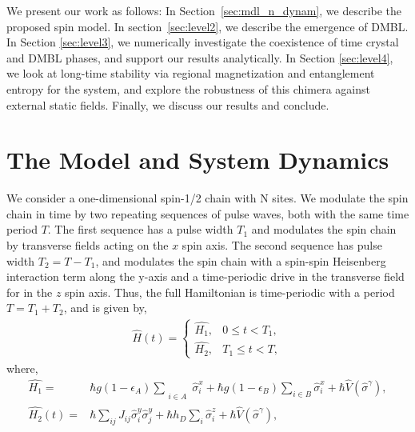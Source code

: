 \documentclass[12pt]{iopart}
\begin{document}
We present our work as follows: In Section~\ref{sec:mdl_n_dynam}, we describe the proposed spin model. In section~\ref{sec:level2}, we describe the emergence of DMBL. In Section \ref{sec:level3}, we numerically investigate the coexistence of time crystal and DMBL phases, and support our results analytically. In Section \ref{sec:level4}, we look at long-time stability via regional magnetization and entanglement entropy for the system, and explore the robustness of this chimera against external static fields. Finally, we discuss our results and conclude.	
	
\section{\label{sec:mdl_n_dynam} The Model and System Dynamics}
We consider a one-dimensional spin-1/2 chain with N sites.  We modulate the spin chain in time by two repeating sequences of pulse waves, both with the same time period $T$.  The first sequence has a pulse width $T_1$ and modulates the spin chain by transverse fields acting on the $x$ spin axis. The second sequence has pulse width $T_2=T-T_1$, and modulates the spin chain with a spin-spin Heisenberg interaction term along the y-axis and a time-periodic drive in the transverse field for in the $z$ spin axis. Thus, the full Hamiltonian is time-periodic with a period $T=T_1+T_2$, and is given by,
\begin{align}
    \hat{H}(t) = 
    \begin{cases}
        \hat{H_1} , & 0\leq t < T_1,\\
        \hat{H_2} , & T_1\leq t < T,
    \end{cases}
    \label{eq:cleanham}
\end{align}
where,
\begin{align}
    \hat{H_1} = & \hbar g (1-\epsilon_A) \sum_{\substack{\\i \in A}}\hat{\sigma}^x_i + \hbar g (1-\epsilon_B) \sum_{i \in B}\hat{\sigma}^x_i+ \hbar\hat{V}(\hat{\sigma}^{\gamma}),\label{eq:sysham1}\\
    \hat{H_2}(t) = & \hbar\sum_{ij} J_{ij} \hat{\sigma}^y_i \hat{\sigma}^y_{j} +  \hbar h_D \sum_i \hat{\sigma}^z_i + \hbar\hat{V}(\hat{\sigma}^{\gamma}),
    \label{eq:sysham2}
\end{align}
\end{document}
